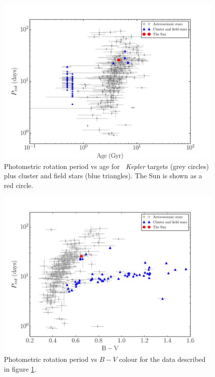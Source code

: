 \begin{figure}
\begin{center}
\includegraphics[width=6in, clip=true]{figures/p_vs_a_paper2.pdf}
\caption[Period vs age for \kepler\ stars]{Photometric rotation period vs age
for \nastero$~$ {\it Kepler} targets (grey circles) plus cluster and field
stars (blue triangles). The Sun is shown as a red circle.
\label{fig:p_vs_a}}
\end{center}
\end{figure}

\begin{figure}
\begin{center}
\includegraphics[width=6in, clip=true, trim=0 0 0.5in 0]{figures/p_vs_bv_paper2.pdf}
\caption[Period vs colour for \kepler\ stars]
{Photometric rotation period vs $B-V$ colour for the data described in figure
\ref{fig:p_vs_a}.
\label{fig:3d}}
\end{center}
\end{figure}


